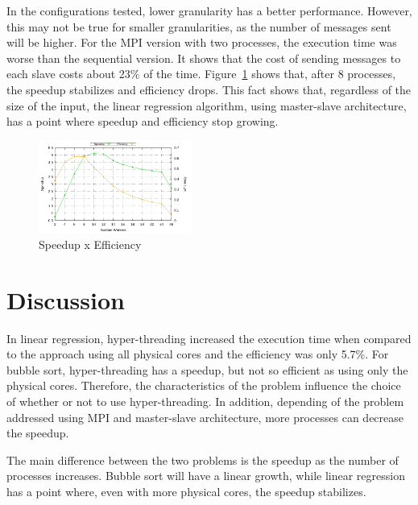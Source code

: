 \documentclass[10pt, twocolumn]{report}
\begin{document}
In the configurations tested, lower granularity has a better performance. However, this may not be true for smaller granularities, as the number of messages sent will be higher. For the MPI version with two processes, the execution time was worse than the sequential version. It shows that the cost of sending messages to each slave costs about 23\% of the time. Figure~\ref{fig:linear-regression-speedup-efficiency} shows that, after 8 processes, the speedup stabilizes and efficiency drops. This fact shows that, regardless of the size of the input, the linear regression algorithm, using master-slave architecture, has a point where speedup and efficiency stop growing.

\begin{figure}[ht]
	\centering
	\includegraphics[width=0.45\textwidth]{../logs/scripts/linear-regression-speedup-efficiency.pdf}
	\caption{Speedup x Efficiency}
	\label{fig:linear-regression-speedup-efficiency}
\end{figure}

\section{Discussion}
In linear regression, hyper-threading increased the execution time when compared to the approach using all physical cores and the efficiency was only 5.7\%. For bubble sort, hyper-threading has a speedup, but not so efficient as using only the physical cores. Therefore, the characteristics of the problem influence the choice of whether or not to use hyper-threading. In addition, depending of the problem addressed using MPI and master-slave architecture, more processes can decrease the speedup.

The main difference between the two problems is the speedup as the number of processes increases. Bubble sort will have a linear growth, while linear regression has a point where, even with more physical cores, the speedup stabilizes.
\end{document}
